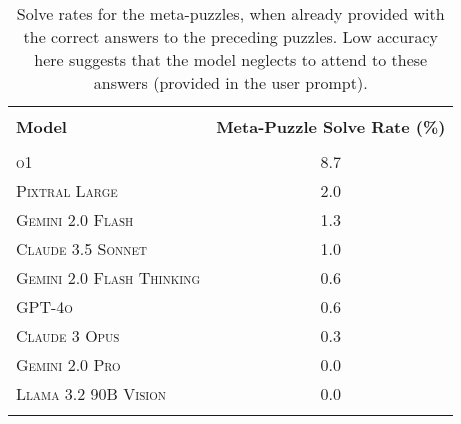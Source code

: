 \begin{table}[!h]
\vspace{-10pt}
\centering
\caption{Solve rates for the \nummetas meta-puzzles, when already provided with the correct answers to the preceding puzzles. Low accuracy here suggests that the model neglects to attend to these answers (provided in the user prompt).}
\vspace{3pt}
\begin{tabular}{lc}
\hline
\\[-9pt]
\textbf{Model} & {\textbf{Meta-Puzzle Solve Rate (\%)}}
\\
\hline
\\[-8pt]
\textsc{o1} & 8.7 \\
\textsc{Pixtral Large} & 2.0 \\
\textsc{Gemini 2.0 Flash} & 1.3 \\
\textsc{Claude 3.5 Sonnet} & 1.0 \\
\textsc{Gemini 2.0 Flash Thinking} & 0.6 \\
\textsc{GPT-4o} & 0.6 \\
\textsc{Claude 3 Opus} & 0.3 \\
\textsc{Gemini 2.0 Pro} & 0.0 \\
\textsc{Llama 3.2 90B Vision} & 0.0 \\
\\[-9pt]
\hline
\end{tabular}
\end{table}
